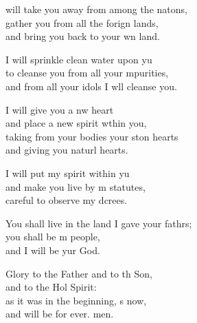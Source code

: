\begin{psalmverse}
  \begin{patverse}
 will take you away from among the nat\pointup{\i}ons,\Flex\\
gather you from all the forign lands,\Med\\
and bring you back to your wn land.

I will sprinkle clean water upon yu\Flex\\
to cleanse you from all your \pointup{\i}mpurities,\Med\\
and from all your idols I w\pointup{\i}ll cleanse you.

I will give you a nw heart\Med\\
and place a new spirit w\pointup{\i}thin you,\\
taking from your bodies your ston hearts\Med\\
and giving you naturl hearts.

I will put my spirit within yu\Flex\\
and make you live by m statutes,\Med\\
careful to observe my dcrees.

You shall live in the land I gave your fathrs;\Flex\\
you shall be m people,\Med\\
and I will be yur God.

Glory to the Father and to th Son,\Med\\
and to the Hol Spirit:\\
as it was in the beginning, \pointup{\i}s now,\Med\\
and will be for ever. men.
  \end{patverse}
  \end{psalmverse}
